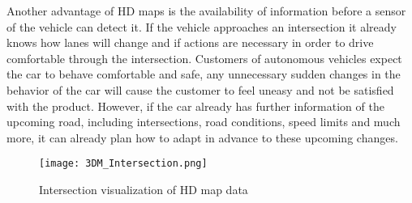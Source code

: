 Another advantage of HD maps is the availability of information before a sensor of the vehicle can detect it. If the vehicle approaches an intersection it already knows how lanes will change and if actions are necessary in order to drive comfortable through the intersection. Customers of autonomous vehicles expect the car to behave comfortable and safe, any unnecessary sudden changes in the behavior of the car will cause the customer to feel uneasy and not be satisfied with the product. However, if the car already has further information of the upcoming road, including intersections, road conditions, speed limits and much more, it can already plan how to adapt in advance to these upcoming changes.
\begin{figure}[!hbt]
\texttt{[image: 3DM\_Intersection.png]}
\caption{Intersection visualization of HD map data}
\label{3dm_intersection}
\end{figure}

